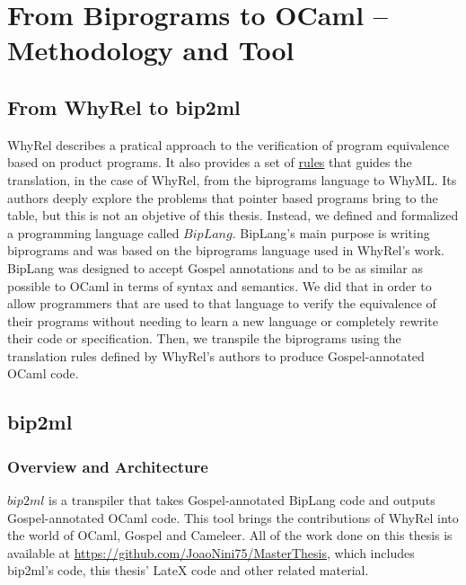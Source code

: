 
%

\chapter{From Biprograms to OCaml -- Methodology and Tool}
\label{cha:methodology}


\FloatBarrier
\section{From WhyRel to bip2ml}
\label{sec:whyrel_to_bip2ml}

WhyRel describes a pratical approach to the verification of program equivalence based on product programs.
It also provides a set of \hyperref[fig:translation-biprograms-rules]{rules} that guides the translation, in the case of WhyRel, from the biprograms language to WhyML.
Its authors deeply explore the problems that pointer based programs bring to the table, but this is not an objetive of this thesis.
Instead, we defined and formalized a programming language called $BipLang$.
BipLang's main purpose is writing biprograms and was based on the biprograms language used in WhyRel's work.
BipLang was designed to accept Gospel annotations and to be as similar as possible to OCaml in terms of syntax and semantics.
We did that in order to allow programmers that are used to that language to verify the equivalence of their programs without needing to learn a new language or completely rewrite their code or specification.
Then, we transpile the biprograms using the translation rules defined by WhyRel's authors to produce Gospel-annotated OCaml code.


\FloatBarrier
\section{bip2ml}
\label{sec:bip2ml}

\FloatBarrier
\subsection{Overview and Architecture}
\label{subsec:bip2ml_overview}

$bip2ml$ is a transpiler that takes Gospel-annotated BipLang code and outputs Gospel-annotated OCaml code.
This tool brings the contributions of WhyRel into the world of OCaml, Gospel and Cameleer.
All of the work done on this thesis is available at \url{https://github.com/JoaoNini75/MasterThesis}, which includes bip2ml's code, this thesis' LateX code and other related material.

